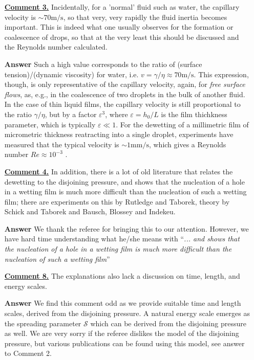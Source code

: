 \documentclass[12pt,english]{article}
\begin{document}
\begin{itemize}
{}

\item[ \textbf{\underline{Comment 3.}}]
{ 
Incidentally, for a 'normal' fluid such as water, the capillary velocity is $\sim 70\mbox{m}/\mbox{s}$, 
so that very, very rapidly the fluid inertia becomes important. 
This is indeed what one usually observes for the formation or coalescence of drops, so that at the very least this should be discussed and the Reynolds number calculated.
}

\item[ \textbf{{Answer}}]
{
Such a high value corresponds to the ratio of (surface tension)/(dynamic viscosity) for water, i.e. $v = \gamma/\eta \approx 70 \mbox{m}/\mbox{s}$.
This expression, though, is only representative of the capillary velocity, again, for {\it free surface flows}, as, e.g., in the coalescence of 
two droplets in the bulk of another fluid. In the case of thin liquid films, the capillary velocity is still proportional to the ratio 
$\gamma/\eta$, but by a factor $\varepsilon^3$, where $\varepsilon = h_0/L$ is the film thichkness parameter, which is typically $\varepsilon \ll 1$.
For the dewetting of a millimetric film of micrometric thickness reatracting into a single droplet, experiments have measured that 
the typical velocity is $\sim 1 \mbox{mm}/\mbox{s}$, which gives a Reynolds number $Re \approx 10^{-3}$ \cite{Edwards}.
}

\item[ \textbf{\underline{Comment 4.}}]
{ 
In addition, there is a lot of old literature that relates the dewetting to the disjoining pressure, and shows that the nucleation of a hole in a wetting film is much more difficult than the nucleation of such a wetting film; there are experiments on this by Rutledge and Taborek, theory by Schick and Taborek and Bausch, Blossey and Indekeu.
}

\item[ \textbf{{Answer}}]
{
We thank the referee for bringing this to our attention.
However, we have hard time understanding what he/she means with ``\textit{... and shows that the nucleation of a hole in a wetting film is much more difficult than the nucleation of such a wetting film}''
}

\item[ \textbf{\underline{Comment 8.}}]
{ 
The explanations also lack a discussion on time, length, and energy scales. 
}

\item[ \textbf{{Answer}}]
{
We find this comment odd as we provide suitable time and length scales, derived from the disjoining pressure.
A natural energy scale emerges as the spreading parameter $\mathcal{S}$ which can be derived from the disjoining pressure as well. 
We are very sorry if the referee dislikes the model of the disjoining pressure, but various publications can be found using this model, see answer to Comment 2.
}


\end{itemize}
\end{document}
